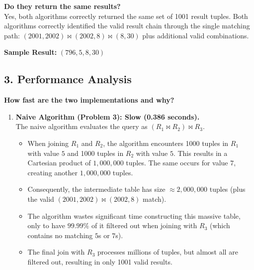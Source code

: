 \documentclass[11pt]{article}
\begin{document}
\textbf{Do they return the same results?} \\
Yes, both algorithms correctly returned the same set of 1001 result tuples. Both algorithms correctly identified the valid result chain through the single matching path: $(2001, 2002) \bowtie (2002, 8) \bowtie (8, 30)$ plus additional valid combinations.

\textbf{Sample Result:} $(796, 5, 8, 30)$

\subsection*{3. Performance Analysis}
\textbf{How fast are the two implementations and why?}

\begin{enumerate}
    \item \textbf{Naive Algorithm (Problem 3): Slow (0.386 seconds).} \\
    The naive algorithm evaluates the query as $(R_1 \bowtie R_2) \bowtie R_3$. 
    \begin{itemize}
        \item When joining $R_1$ and $R_2$, the algorithm encounters 1000 tuples in $R_1$ with value $5$ and 1000 tuples in $R_2$ with value $5$. This results in a Cartesian product of $1,000,000$ tuples. The same occurs for value $7$, creating another $1,000,000$ tuples.
        \item Consequently, the intermediate table has size $\approx 2,000,000$ tuples (plus the valid $(2001, 2002) \bowtie (2002, 8)$ match).
        \item The algorithm wastes significant time constructing this massive table, only to have $99.99\%$ of it filtered out when joining with $R_3$ (which contains no matching $5$s or $7$s).
        \item The final join with $R_3$ processes millions of tuples, but almost all are filtered out, resulting in only 1001 valid results.
    \end{itemize}


\end{enumerate}
\end{document}
